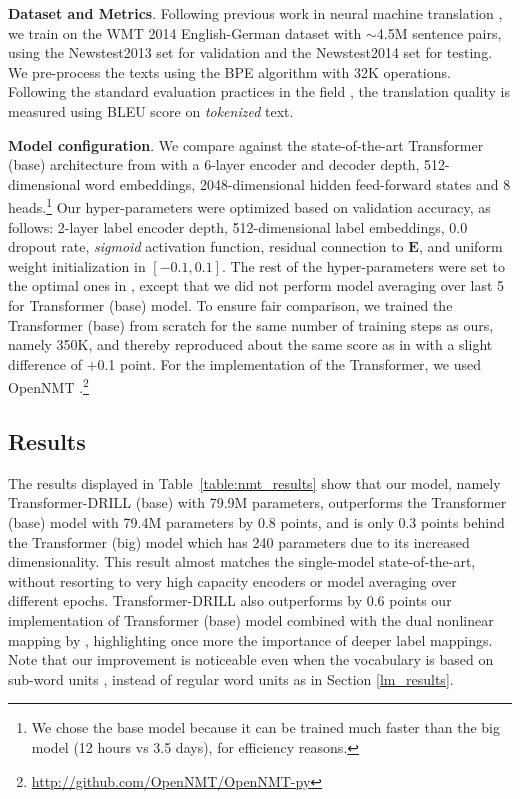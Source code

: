 \documentclass{article}
\begin{document}
\textbf{Dataset and Metrics}. 
Following previous work in neural machine translation \cite{NIPS2017_7181}, we train on the WMT 2014 English-German dataset with $\sim$4.5M sentence pairs, using the Newstest2013 set for validation and the Newstest2014 set for testing. We pre-process the texts using the BPE algorithm  \cite{sennrich15} with 32K  operations. Following the standard evaluation practices in the field \cite{bojar-EtAl:2017:WMT1}, the translation quality is measured using BLEU score  \citep{papineni-EtAl:2002:ACL} on \emph{tokenized} text.

\textbf{Model configuration}.
We compare against the state-of-the-art Transformer (base) architecture from  \citet{NIPS2017_7181} with a 6-layer encoder and decoder depth, 512-dimensional word embeddings, 2048-dimensional hidden feed-forward states and 8 heads.\footnote{We chose the base model because it can be trained much faster than the big model (12 hours vs 3.5 days), for efficiency reasons.} Our hyper-parameters were optimized based on validation accuracy, as follows: 2-layer label encoder depth, 512-dimensional label embeddings, 0.0 dropout rate, \textit{sigmoid} activation function, residual connection to $\mathbf{E}$, and uniform weight initialization in $[-0.1, 0.1]$. The rest of the hyper-parameters were set to the optimal ones in \citep{NIPS2017_7181}, except that we did not perform model averaging over last 5  for Transformer (base) model. To ensure fair comparison, we trained the Transformer (base) from scratch for the same number of training steps as ours, namely 350K, and thereby reproduced about the same score as in \citep{NIPS2017_7181} with a slight difference of +0.1 point. 
For the implementation of the Transformer, we used OpenNMT \citep{opennmt}.\footnote{\url{http://github.com/OpenNMT/OpenNMT-py}}

\subsection{Results}

The results displayed in Table~\ref{table:nmt_results} show that our model, namely Transformer-DRILL (base) with 79.9M parameters, outperforms the Transformer (base) model with 79.4M parameters by 0.8 points, and is only 0.3 points behind the Transformer (big) model which has 240 parameters due to its increased dimensionality. This result almost matches the single-model state-of-the-art, without
resorting to very high capacity encoders or model averaging over different epochs. Transformer-DRILL also outperforms by 0.6 points our implementation of Transformer (base) model combined with the dual nonlinear mapping by \citet{pappas18}, highlighting once more the importance of deeper label mappings. Note that our improvement is noticeable even when the vocabulary is based on sub-word units \cite{sennrich15}, instead of regular word units as in Section \ref{lm_results}. 
\end{document}
